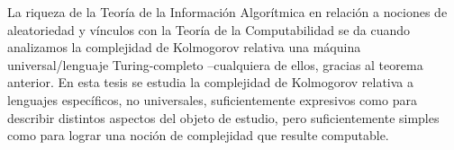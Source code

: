 La riqueza de la Teoría de la Información Algorítmica en relación a nociones de aleatoriedad y vínculos con la Teoría de la Computabilidad se da cuando analizamos la complejidad de Kolmogorov relativa una máquina universal/lenguaje Turing-completo --cualquiera de ellos, gracias al teorema anterior. En esta tesis se estudia la complejidad de Kolmogorov relativa a lenguajes específicos, no universales, suficientemente expresivos como para describir distintos aspectos del objeto de estudio, pero suficientemente simples como para lograr una noción de complejidad que resulte computable.



